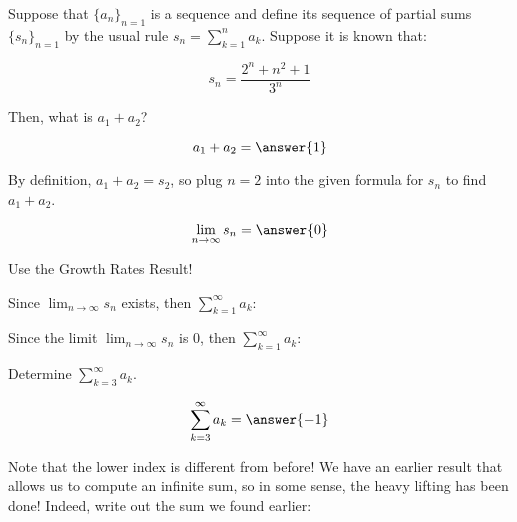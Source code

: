 \documentclass{ximera}
\author{Jim Talamo}
\begin{document}
\begin{exercise}
Suppose that $\{a_n\}_{n=1}$ is a sequence and define its sequence of partial sums $\{s_n\}_{n=1}$ by the usual rule $s_n = \sum_{k=1}^n a_k$.  Suppose it is known that:

\[
s_n = \frac{2^n+n^2+1}{3^n}
\]

Then, what is $a_1+a_2$?

\[
a_1+a_2= \answer{1}
\]
\begin{hint}
By definition, $a_1+a_2 = s_2$, so plug $n=2$ into the given formula for $s_n$ to find $a_1+a_2$.
\end{hint}
\begin{exercise}
\[
\lim_{n \to \infty} s_n = \answer{0}
\]
\begin{hint}
Use the Growth Rates Result!
\end{hint}
\begin{exercise}
Since $\lim_{n \to \infty} s_n$ exists, then $\sum_{k=1}^{\infty} a_k$:


\begin{multipleChoice}
\end{multipleChoice}

Since the limit $\lim_{n \to \infty} s_n$ is $0$, then $\sum_{k=1}^{\infty} a_k$:
\begin{multipleChoice}
\end{multipleChoice}

\begin{exercise}
Determine $\sum_{k=3}^{\infty} a_k$.

\[
\sum_{k=3}^{\infty} a_k = \answer{-1}
\]

\begin{hint}
Note that the lower index is different from before!  We have an earlier result that allows us to compute an infinite sum, so in some sense, the heavy lifting has been done!  Indeed, write out the sum we found earlier:
\begin{image}
  \end{image}
\end{hint}


\end{exercise}
\end{exercise}
\end{exercise}
\end{exercise}
\end{document}
